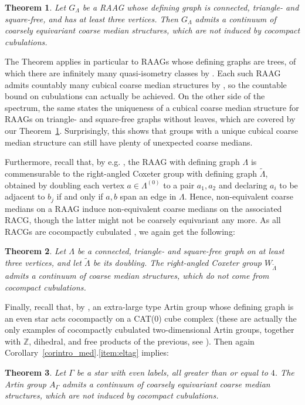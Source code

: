 \documentclass[svgnames]{amsart}
\theoremstyle{plain}
\newtheorem{thmintro}{Theorem}
\theoremstyle{definition}
\newcommand{\Z}{\mathbb{Z}}
\begin{document}
\begin{thmintro}\label{thmintro_raag}
    Let $G_\Lambda$ be a RAAG whose defining graph is connected, triangle- and square-free, and has at least three vertices. Then $G_\Lambda$ admits a continuum of coarsely equivariant coarse median structures, which are not induced by cocompact cubulations.
\end{thmintro}

The Theorem applies in particular to RAAGs whose defining graphs are trees, of which there are infinitely many quasi-isometry classes by \cite{behrstock_neumann:graph_manifold_raag}. Each such RAAG admits countably many cubical coarse median structures by \cite[Theorem 3.19]{CoarseCubicalRig}, so the countable bound on cubulations can actually be achieved. On the other side of the spectrum, the same \cite[Theorem 3.19]{CoarseCubicalRig} states the uniqueness of a cubical coarse median structure for RAAGs on triangle- and square-free graphs without leaves, which are covered by our Theorem~\ref{thmintro_raag}. Surprisingly, this shows that groups with a unique cubical coarse median structure can still have plenty of unexpected coarse medians.


Furthermore, recall that, by e.g. \cite{raag_into_racg}, the RAAG with defining graph $\Lambda$ is commensurable to the right-angled Coxeter group with defining graph $\widetilde{\Lambda}$, obtained by doubling each vertex $a\in \Lambda^{(0)}$ to a pair $a_1,a_2$ and declaring $a_i$ to be adjacent to $b_j$ if and only if $a,b$ span an edge in $\Lambda$. Hence, non-equivalent coarse medians on a RAAG induce non-equivalent coarse medians on the associated RACG, though the latter might not be coarsely equivariant any more. As all RACGs are cocompactly cubulated \cite{Niblo_reeves}, we again get the following:


\begin{thmintro}\label{thmintro_racg}
    Let $\Lambda$ be a connected, triangle- and square-free graph on at least three vertices, and let $\widetilde{\Lambda}$ be its doubling. The right-angled Coxeter group $W_{\widetilde{\Lambda}}$ admits a continuum of coarse median structures, which do not come from cocompact cubulations.
\end{thmintro}

Finally, recall that, by \cite[Theorem C]{haettel_cocompactly_artin}, an extra-large type Artin group whose defining graph is an even star acts cocompactly on a CAT(0) cube complex (these are actually the only examples of cocompactly cubulated  two-dimensional Artin groups, together with $\Z$, dihedral, and free products of the previous, see \cite[Theorem 1.1]{C(0)CC_Artin}). Then again Corollary~\ref{corintro_med}.\ref{item:eltag} implies:
\begin{thmintro}\label{thmintro_artin}
    Let $\Gamma$ be a star with even labels, all greater than or equal to $4$. The Artin group $A_\Gamma$ admits a continuum of coarsely equivariant coarse median structures, which are not induced by cocompact cubulations.
\end{thmintro}
\end{document}
